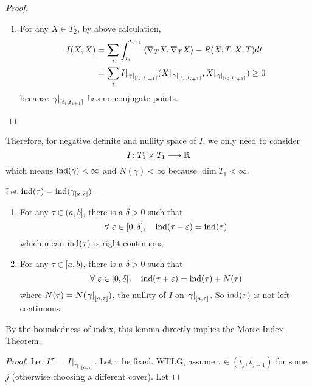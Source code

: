 \begin{enumerate}[label=\arabic{*}.]
\begin{proof}
\begin{enumerate}[label=(\arabic{*})]
			\item For any $X \in T_2$, by above calculation,
			\begin{equation*}
				\begin{aligned}
					I(X,X) &= \sum_i \int_{t_i}^{t_{i+1}}\left\langle\nabla_T X, \nabla_T X\right\rangle-R(X, T, X, T) d t\\
					&= \sum_i I|_{\left.\gamma\right\lvert_{[t_i,t_{i+1}]}}(X|_{\left.\gamma\right\lvert_{[t_i,t_{i+1}]}},X|_{\left.\gamma\right\lvert_{[t_i,t_{i+1}]}}) \geq 0
				\end{aligned}
			\end{equation*}
			because $\left.\gamma\right\lvert_{[t_i,t_{i+1}]}$ has no conjugate points. \qedhere
		\end{enumerate}
	\end{proof}
	Therefore, for negative definite and nullity space of $I$, we only need to consider
	\begin{equation*}
		I \colon T_1 \times T_1 \longrightarrow \mathbb{R}
	\end{equation*}
	which means $\operatorname{ind}(\gamma) < \infty$ and $N(\gamma) < \infty$ because $\dim T_1 < \infty$.
	\begin{lem}
		Let $\operatorname{ind}(\tau) = \operatorname{ind}(\gamma_{[a,\tau]})$.
		\begin{enumerate}[label=(\arabic*)]
			\item For any $\tau \in (a,b]$, there is a $\delta > 0$ such that
			\begin{equation*}
				\forall~\varepsilon \in [0,\delta],\quad \operatorname{ind}(\tau-\varepsilon) = \operatorname{ind}(\tau)
			\end{equation*}
			which mean $\operatorname{ind}(\tau)$ is right-continuous.
			\item For any $\tau \in [a,b)$, there is a $\delta > 0$ such that
			\begin{equation*}
				\forall~\varepsilon \in [0,\delta],\quad \operatorname{ind}(\tau+\varepsilon) = \operatorname{ind}(\tau) + N(\tau)
			\end{equation*}
			where $N(\tau) = N(\left.\gamma\right\lvert_{[a,\tau]})$, the nullity of $I$ on $\left.\gamma\right\lvert_{[a,\tau]}$. So $\operatorname{ind}(\tau)$ is not left-continuous.
		\end{enumerate}
	\end{lem}
	\begin{rmk}
		By the boundedness of index, this lemma directly implies the Morse Index Theorem.
	\end{rmk}
	\begin{proof}
		Let $I^\tau = \left.I\right\lvert_{\left.\gamma\right\lvert_{[a,\tau]}}$. Let $\tau$ be fixed. WTLG, assume $\tau \in (t_j,t_{j+1})$ for some $j$ (otherwise choosing a different cover). Let

\end{proof}
\end{enumerate}
